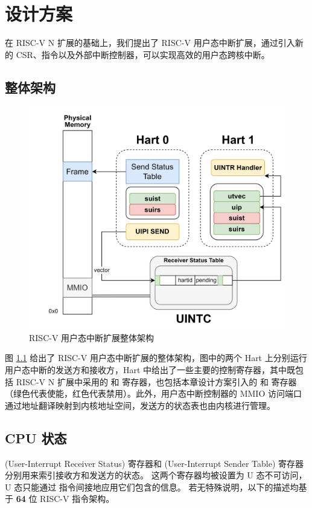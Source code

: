 
\chapter{设计方案}

在 RISC-V N 扩展的基础上，我们提出了 RISC-V 用户态中断扩展，通过引入新的 CSR、指令以及外部中断控制器，可以实现高效的用户态跨核中断。

\section{整体架构}

\begin{figure}
    \centering
    \includegraphics[width=0.8\linewidth]{figures/uintr.png}
    \caption{RISC-V 用户态中断扩展整体架构}
    \label{fig:uintr}
\end{figure}

图 \ref{fig:uintr} 给出了 RISC-V 用户态中断扩展的整体架构，图中的两个 Hart 上分别运行用户态中断的发送方和接收方，Hart 中给出了一些主要的控制寄存器，其中既包括 RISC-V N 扩展中采用的 \Rutvec 和 \Ruip 寄存器，也包括本章设计方案引入的 \Rsuirs 和 \Rsuist 寄存器（绿色代表使能，红色代表禁用）。此外，用户态中断控制器的 MMIO 访问端口通过地址翻译映射到内核地址空间，发送方的状态表也由内核进行管理。

\section{CPU 状态}

\textbf{\Rsuirs}(User-Interrupt Receiver Status) 寄存器和 \textbf{\Rsuist}(User-Interrupt Sender Table) 寄存器分别用来索引接收方和发送方的状态。
这两个寄存器均被设置为 U 态不可访问，U 态只能通过 \Iuipi 指令间接地应用它们包含的信息。
若无特殊说明，以下的描述均基于 \textbf{64} 位 RISC-V 指令架构。

